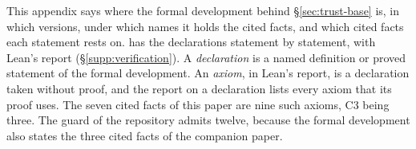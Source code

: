 This appendix says where the formal development behind \S\ref{sec:trust-base} is, in which
versions, under which names it holds the cited facts, and which cited facts each statement
rests on. \suppl{} has the declarations statement by statement, with Lean's report
(\S\ref{supp:verification}).
A \emph{declaration} is a named definition or proved statement of the formal
development. An \emph{axiom}, in Lean's report, is a declaration taken without proof, and the
report on a declaration lists every axiom that its proof uses. The seven cited facts of this
paper are nine such axioms, C3 being three. The guard of the repository admits twelve, because
the formal development also states the three cited facts of the companion paper.

